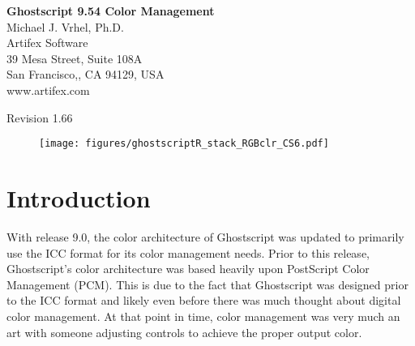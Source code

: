 \documentclass[12pt,notitlepage]{article}
\begin{document}
\begin{titlepage}

\begin{center}{\huge \bf Ghostscript 9.54 Color Management\\} \vspace{0.5in} {\Large Michael J.
Vrhel, Ph.D.\\} {\Large Artifex Software\\} {\Large 39 Mesa Street, Suite 108A\\} {\Large San Francisco,, CA 94129, USA\\}
{\Large www.artifex.com\\}
\end{center}
\vspace*{0.5in}
\begin{abstract}
This document provides information about the color architecture in Ghostscript 9.54. The document is suitable for users who wish to
obtain accurate color with their output device as well as for developers who wish to customize Ghostscript to achieve a higher
level of control and/or interface with a different color management module.
\end{abstract}
\begin{center}
\vspace*{0.25in}
Revision 1.66
\vspace*{0.25in}
\capstartfalse
\begin{figure}[h]
    \begin{center}
\texttt{[image: figures/ghostscriptR\_stack\_RGBclr\_CS6.pdf]}
    \end{center}
\end{figure}
\capstarttrue

\end{center}

\end{titlepage}

\renewcommand{\baselinestretch}{1.67}\normalsize

\clearpage

\singlespace

\section{Introduction}

With release 9.0, the color architecture of Ghostscript was updated to primarily use the ICC\cite{ICC} format for its color management needs.  Prior to this release, Ghostscript's color architecture was based heavily upon PostScript\cite{PS} Color Management (PCM).  This is due to the fact that Ghostscript was designed prior to the ICC format and likely even before there was much thought about digital color management.  At that point in time, color management was very much an art with someone adjusting controls to achieve the proper output color.
\end{document}
